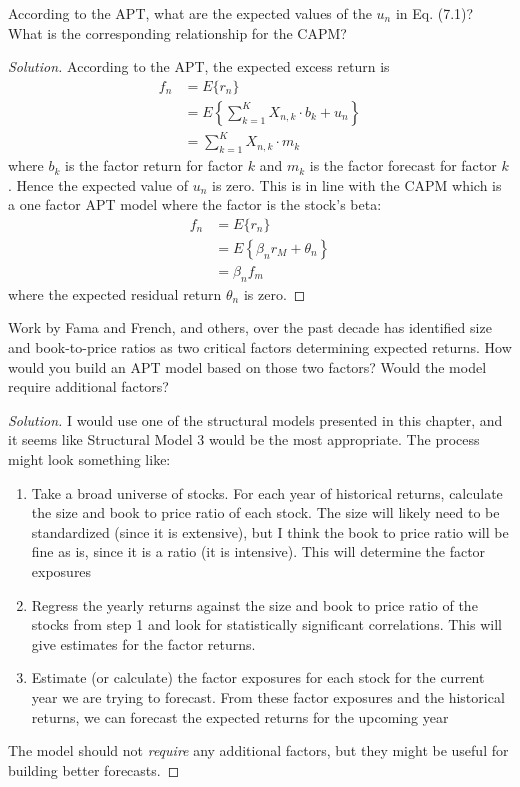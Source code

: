 \begin{problem}{7.1}
  According to the APT, what are the expected values of the $u_{n}$ in Eq. (7.1)? What is the corresponding relationship for the CAPM?
\end{problem}

\begin{proof}[Solution]
  According to the APT, the expected excess return is
  \begin{align*}
   f_{n}&=E\{r_{n}\}\\
	&=E\left\{\sum_{k=1}^{K}X_{n,k}\cdot b_{k} + u_{n}\right\}\\
	&=\sum_{k=1}^{K}X_{n,k}\cdot m_{k}
  \end{align*}
  where $b_{k}$ is the factor return for factor $k$ and $m_{k}$ is the factor forecast for factor $k$. Hence the expected value of $u_{n}$ is zero. This is in line with the CAPM which is a one factor APT model where the factor is the stock's beta:
  \begin{align*}
   f_{n}&=E\{r_{n}\}\\
	&=E\left\{\beta_{n}r_{M} + \theta_{n}\right\}\\
	&=\beta_{n}f_{m}
  \end{align*}
  where the expected residual return $\theta_{n}$ is zero.

\end{proof}

\begin{problem}{7.2}
 Work by Fama and French, and others, over the past decade has identified size and book-to-price ratios as two critical factors determining expected returns. How would you build an APT model based on those two factors? Would the model require additional factors?
\end{problem}

\begin{proof}[Solution]
 I would use one of the structural models presented in this chapter, and it seems like Structural Model 3 would be the most appropriate. The process might look something like:
 \begin{enumerate}
  \item{Take a broad universe of stocks. For each year of historical returns, calculate the size and book to price ratio of each stock. The size will likely need to be standardized (since it is extensive), but I think the book to price ratio will be fine as is, since it is a ratio (it is intensive). This will determine the factor exposures}
  \item{Regress the yearly returns against the size and book to price ratio of the stocks from step 1 and look for statistically significant correlations. This will give estimates for the factor returns.}
  \item{Estimate (or calculate) the factor exposures for each stock for the current year we are trying to forecast. From these factor exposures and the historical returns, we can forecast the expected returns for the upcoming year}
 \end{enumerate}
 The model should not \textit{require} any additional factors, but they might be useful for building better forecasts.
\end{proof}

